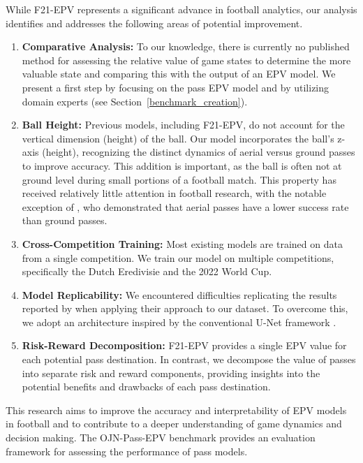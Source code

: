 


While F21-EPV represents a significant advance in football analytics, our analysis identifies and addresses the following areas of potential improvement.

\begin{enumerate}
    \item \textbf{Comparative Analysis:} 
        To our knowledge, there is currently no published method for assessing the relative value of game states to determine the more valuable state and comparing this with the output of an EPV model. We present a first step by focusing on the pass EPV model and by utilizing domain experts (see Section~\ref{benchmark_creation}).
    \item \textbf{Ball Height:}
        Previous models, including F21-EPV, do not account for the vertical dimension (height) of the ball. Our model incorporates the ball's z-axis (height), recognizing the distinct dynamics of aerial versus ground passes to improve accuracy. This addition is important, as the ball is often not at ground level during small portions of a football match. This property has received relatively little attention in football research, with the notable exception of \cite{haland2020evaluating}, who demonstrated that aerial passes have a lower success rate than ground passes.

    \item \textbf{Cross-Competition Training:}
        Most existing models are trained on data from a single competition. We train our model on multiple competitions, specifically the Dutch Eredivisie and the 2022 World Cup.
    
    \item \textbf{Model Replicability:}  
        We encountered difficulties replicating the results reported by \cite{Fernández2021} when applying their approach to our dataset. To overcome this, we adopt an architecture inspired by the conventional U-Net framework \citep{ronneberger2015unet}. 

    \item \textbf{Risk-Reward Decomposition:}
        F21-EPV provides a single EPV value for each potential pass destination. In contrast, we decompose the value of passes into separate risk and reward components, providing insights into the potential benefits and drawbacks of each pass destination.
\end{enumerate}

This research aims to improve the accuracy and interpretability of EPV models in football and to contribute to a deeper understanding of game dynamics and decision making. The OJN-Pass-EPV benchmark provides an evaluation framework for assessing the performance of pass models.
